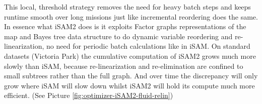 This local, threshold strategy removes the need for heavy batch steps and keeps runtime smooth over long missions just like incremental reordering does the same. In essence what \gls{iSAM}2 does is it exploits Factor graphs representations of the map and Bayes tree data structure to do dynamic variable reordering and re-linearization, no need for periodic batch calculations like in \gls{iSAM}. On standard datasets (Victoria Park) the cumulative computation of \gls{iSAM}2 grows much more slowly than \gls{iSAM}, because re-linearization and re-elimination are confined to small subtrees rather than the full graph. And over time the discrepancy will only grow where \gls{iSAM} will slow down whilst \gls{iSAM}2 will hold its compute much more efficient. (See Picture \ref{fig:optimizer-iSAM2-fluid-relin})
\\ \\
